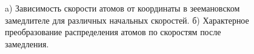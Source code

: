 



\begin{minipage}{0.65\textwidth}

\begin{figure}[ht]
    \centering
    \hspace{5 mm} 
    \caption{a) Зависимость скорости атомов от координаты в зеемановском замедлителе  для различных начальных скоростей. б) Характерное преобразование распределения атомов по скоростям после замедления. }
\end{figure}


\end{minipage}
\hfill
